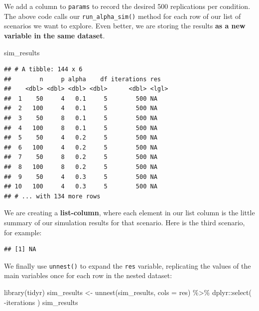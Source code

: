 \documentclass[
]{book}
\newenvironment{Shaded}{\begin{snugshade}}{\end{snugshade}}
\newcommand{\AttributeTok}[1]{\textcolor[rgb]{0.77,0.63,0.00}{#1}}
\newcommand{\DecValTok}[1]{\textcolor[rgb]{0.00,0.00,0.81}{#1}}
\newcommand{\FunctionTok}[1]{\textcolor[rgb]{0.00,0.00,0.00}{#1}}
\newcommand{\NormalTok}[1]{#1}
\newcommand{\OtherTok}[1]{\textcolor[rgb]{0.56,0.35,0.01}{#1}}
\newcommand{\SpecialCharTok}[1]{\textcolor[rgb]{0.00,0.00,0.00}{#1}}
\begin{document}
We add a column to \texttt{params} to record the desired 500 replications per condition.
The above code calls our \texttt{run\_alpha\_sim()} method for each row of our list of scenarios we want to explore.
Even better, we are storing the results \textbf{as a new variable in the same dataset}.

\begin{Shaded}
\begin{Highlighting}[]
\NormalTok{sim\_results}
\end{Highlighting}
\end{Shaded}

\begin{verbatim}
## # A tibble: 144 x 6
##        n     p alpha    df iterations res  
##    <dbl> <dbl> <dbl> <dbl>      <dbl> <lgl>
##  1    50     4   0.1     5        500 NA   
##  2   100     4   0.1     5        500 NA   
##  3    50     8   0.1     5        500 NA   
##  4   100     8   0.1     5        500 NA   
##  5    50     4   0.2     5        500 NA   
##  6   100     4   0.2     5        500 NA   
##  7    50     8   0.2     5        500 NA   
##  8   100     8   0.2     5        500 NA   
##  9    50     4   0.3     5        500 NA   
## 10   100     4   0.3     5        500 NA   
## # ... with 134 more rows
\end{verbatim}

We are creating a \textbf{list-column}, where each element in our list column is the little summary of our simulation results for that scenario.
Here is the third scenario, for example:

\begin{Shaded}
\end{Shaded}

\begin{verbatim}
## [1] NA
\end{verbatim}

We finally use \texttt{unnest()} to expand the \texttt{res} variable, replicating the values of the main variables once for each row in the nested dataset:

\begin{Shaded}
\begin{Highlighting}[]
\FunctionTok{library}\NormalTok{(tidyr)}
\NormalTok{sim\_results }\OtherTok{\textless{}{-}} \FunctionTok{unnest}\NormalTok{(sim\_results, }\AttributeTok{cols =}\NormalTok{ res) }\SpecialCharTok{\%\textgreater{}\%}
\NormalTok{  dplyr}\SpecialCharTok{::}\FunctionTok{select}\NormalTok{( }\SpecialCharTok{{-}}\NormalTok{iterations )}
\NormalTok{sim\_results}
\end{Highlighting}
\end{Shaded}
\end{document}
